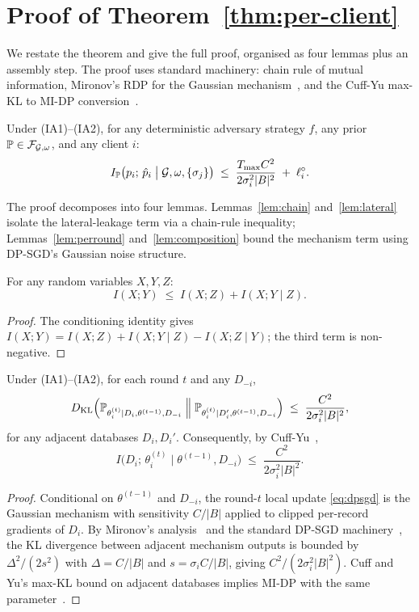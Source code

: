 \section{Proof of Theorem~\ref{thm:per-client}}
\label{app:thm1}

We restate the theorem and give the full proof, organised as four
lemmas plus an assembly step. The proof uses standard machinery:
chain rule of mutual information, Mironov's RDP for the Gaussian
mechanism~\cite{mironov2017rdp}, and the Cuff-Yu max-KL to MI-DP
conversion~\cite{cuff2016mi}.

\setcounter{theorem}{0}
\renewcommand{\thetheorem}{\thesection.\arabic{theorem}}

\begin{theorem}[restated]
Under (IA1)--(IA2), for any deterministic adversary strategy $f$,
any prior $\mathbb{P} \in \mathcal{F}_{\mathcal{G},\omega}$, and any client $i$:
\[
I_{\mathbb{P}}\big(p_i;\,\hat p_i \;\big|\; \mathcal{G},\omega,\{\sigma_j\}\big)
\;\leq\;
\frac{T_{\max} C^2}{2\sigma_i^2 |B|^2}
\;+\;
\ell_i^\circ.
\]
\end{theorem}

The proof decomposes into four lemmas. Lemmas~\ref{lem:chain}
and~\ref{lem:lateral} isolate the lateral-leakage term via a chain-rule
inequality; Lemmas~\ref{lem:perround} and~\ref{lem:composition} bound
the mechanism term using DP-SGD's Gaussian noise structure.

\begin{lemma}
\label{lem:chain}
For any random variables $X, Y, Z$:
\[
I(X;Y) \;\leq\; I(X;Z) + I(X;Y \mid Z).
\]
\end{lemma}
\begin{proof}
The conditioning identity gives
\(I(X;Y) = I(X;Z) + I(X;Y \mid Z) - I(X;Z \mid Y)\); the third term is
non-negative.
\end{proof}

\begin{lemma}
\label{lem:perround}
Under (IA1)--(IA2), for each round $t$ and any $D_{-i}$,
\[
D_{\mathrm{KL}}\Big(
\mathbb{P}_{\theta_i^{(t)} \mid D_i, \theta^{(t-1)}, D_{-i}}
\;\Big\|\;
\mathbb{P}_{\theta_i^{(t)} \mid D_i', \theta^{(t-1)}, D_{-i}}
\Big)
\;\leq\; \frac{C^2}{2\sigma_i^2 |B|^2},
\]
for any adjacent databases $D_i, D_i'$. Consequently, by
Cuff-Yu~\cite{cuff2016mi},
\[
I\big(D_i;\, \theta_i^{(t)} \;\big|\; \theta^{(t-1)}, D_{-i}\big)
\;\leq\; \frac{C^2}{2\sigma_i^2 |B|^2}.
\]
\end{lemma}
\begin{proof}
Conditional on $\theta^{(t-1)}$ and $D_{-i}$, the round-$t$ local update
\eqref{eq:dpsgd} is the Gaussian mechanism with sensitivity $C/|B|$
applied to clipped per-record gradients of $D_i$. By Mironov's
analysis~\cite{mironov2017rdp} and the standard DP-SGD machinery~\cite{abadi2016dpsgd},
the KL divergence between adjacent mechanism outputs is bounded by
$\Delta^2/(2s^2)$ with $\Delta = C/|B|$ and $s = \sigma_i C/|B|$, giving
$C^2/(2\sigma_i^2 |B|^2)$. Cuff and Yu's max-KL bound on
adjacent databases implies MI-DP with the same parameter~\cite{cuff2016mi}.
\end{proof}

